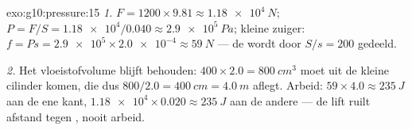 \begin{solution}{exo:g10:pressure:15}
\emph{1.}  $F = 1200 \times 9.81 \approx \qty{1.18e4}{N}$; 
$P = F/S = \num{1.18e4}/0.040 \approx \qty{2.9e5}{Pa}$; kleine zuiger:
$f = P s = \num{2.9e5} \times \num{2.0e-4} \approx \qty{59}{N}$ --- de
 wordt door $S/s = 200$ gedeeld.

\emph{2.} Het vloeistofvolume blijft behouden:
$400 \times 2.0 = \qty{800}{cm^3}$ moet uit de kleine cilinder komen,
die dus $800/2.0 = \qty{400}{cm} = \qty{4.0}{m}$ aflegt. Arbeid:
$59 \times 4.0 \approx \qty{235}{J}$ aan de ene kant,
$\num{1.18e4} \times 0.020 \approx \qty{235}{J}$ aan de andere --- de
lift ruilt afstand tegen , nooit arbeid.
\end{solution}


